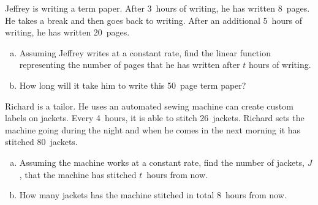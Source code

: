 \documentclass[11pt,letterpaper]{article}
\begin{document}

 Jeffrey is writing a term paper. After 3~hours of writing, he has written 8~pages. He takes a break and then goes back to writing. After an additional 5~hours of writing, he has written 20~pages. 
	\begin{enumerate}[(a)]
	\item Assuming Jeffrey writes at a constant rate, find the linear function representing the number of pages that he has written after $t$ hours of writing. 
	\item How long will it take him to write this 50~page term paper?
	\end{enumerate}



\newpage



 Richard is a tailor. He uses an automated sewing machine can create custom labels on jackets. Every 4~hours, it is able to stitch 26~jackets. Richard sets the machine going during the night and when he comes in the next morning it has stitched 80~jackets.
	\begin{enumerate}[(a)]
	\item Assuming the machine works at a constant rate, find the number of jackets, $J$, that the machine has stitched $t$~hours from now.
	\item How many jackets has the machine stitched in total 8~hours from now. 
	\end{enumerate}
\end{document}
